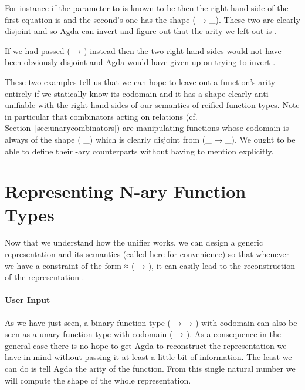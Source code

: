 For instance if the  parameter to  is known to be
 then the right-hand side of the first equation is  and
the second's one has the shape {( → \_)}. These two are clearly
disjoint and so Agda can invert  and figure out that the
arity we left out is .


If we had passed {( → )} instead then the two right-hand
sides would not have been obviously disjoint and Agda would have given
up on trying to invert .


These two examples tell us that we can hope to leave out a function's
arity entirely if we statically know its codomain and it has a shape
clearly anti-unifiable with the right-hand sides of our semantics of
reified function types. Note in particular that combinators acting
on relations (cf. Section~\ref{sec:unarycombinators}) are manipulating
functions whose codomain is always of the shape {( \_)} which
is clearly disjoint from {(\_ → \_)}. We ought to be able to define
their -ary counterparts without having to mention  explicitly.

\section{Representing N-ary Function Types}\label{sec:naryfunction}

Now that we understand how the unifier works, we can design a generic
representation and its semantics (called  here for convenience)
so that whenever we have a constraint of the form
{   ≈ ( → )}, it can easily
lead to the reconstruction of the representation .

\paragraph{User Input} As we have just seen, a binary function type
{( →  → )} with codomain  can also be seen as
a unary function type with codomain {( → )}. As a consequence
in the general case there is no hope to get Agda to reconstruct the
representation we have in mind without passing it at least a little bit
of information. The least we can do is tell Agda the arity of the function.
From this single natural number we will compute the shape of the whole
representation.

